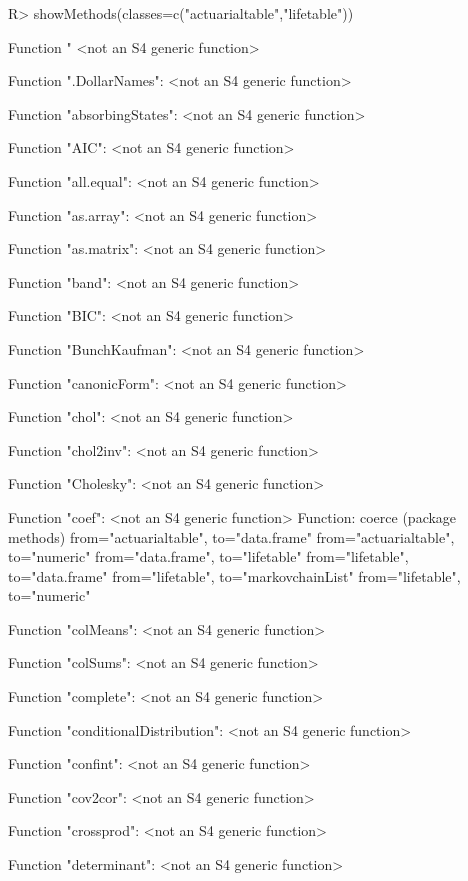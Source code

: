 \documentclass[nojss]{jss}
\begin{document}
\begin{Schunk}
\begin{Sinput}
R> showMethods(classes=c("actuarialtable","lifetable"))
\end{Sinput}
\begin{Soutput}
Function "%
 <not an S4 generic function>

Function ".DollarNames":
 <not an S4 generic function>

Function "absorbingStates":
 <not an S4 generic function>

Function "AIC":
 <not an S4 generic function>

Function "all.equal":
 <not an S4 generic function>

Function "as.array":
 <not an S4 generic function>

Function "as.matrix":
 <not an S4 generic function>

Function "band":
 <not an S4 generic function>

Function "BIC":
 <not an S4 generic function>

Function "BunchKaufman":
 <not an S4 generic function>

Function "canonicForm":
 <not an S4 generic function>

Function "chol":
 <not an S4 generic function>

Function "chol2inv":
 <not an S4 generic function>

Function "Cholesky":
 <not an S4 generic function>

Function "coef":
 <not an S4 generic function>
Function: coerce (package methods)
from="actuarialtable", to="data.frame"
from="actuarialtable", to="numeric"
from="data.frame", to="lifetable"
from="lifetable", to="data.frame"
from="lifetable", to="markovchainList"
from="lifetable", to="numeric"


Function "colMeans":
 <not an S4 generic function>

Function "colSums":
 <not an S4 generic function>

Function "complete":
 <not an S4 generic function>

Function "conditionalDistribution":
 <not an S4 generic function>

Function "confint":
 <not an S4 generic function>

Function "cov2cor":
 <not an S4 generic function>

Function "crossprod":
 <not an S4 generic function>

Function "determinant":
 <not an S4 generic function>


\end{Soutput}
\end{Schunk}
\end{document}
